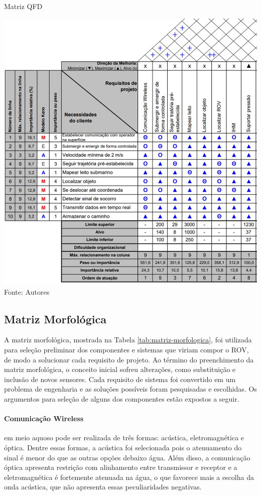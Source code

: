 \begin{table}[h!]
	\centering
	\caption{Matriz QFD}
	\label{tab:qfd-brov-recorte}
	\includegraphics[width=1\linewidth]{images/QFD-BROV.png}\\
	\footnotesize Fonte: Autores
\end{table}

\subsection{Matriz Morfológica}
\label{subsec:matriz-morfologica}

A matriz morfológica, mostrada na Tabela \ref{tab:matriz-morfologica}, foi utilizada para seleção preliminar dos componentes e sistemas que viriam compor o ROV, de modo a solucionar cada requisito de projeto. Ao término do preenchimento da matriz morfológica, o conceito inicial sofreu alterações, como substituição e inclusão de novos sensores. Cada requisito de sistema foi convertido em um problema de engenharia e as soluções possíveis foram pesquisadas e escolhidas. Os argumentos para seleção de alguns dos componentes estão expostos a seguir.

\paragraph{Comunicação Wireless} em meio aquoso pode ser realizada de três formas: acústica, eletromagnética e óptica. Dentre essas formas, a acústica foi selecionada pois o atenuamento do sinal é menor do que as outras opções debaixo água. Além disso, a comunicação óptica apresenta restrição com alinhamento entre transmissor e receptor e a eletromagnética é fortemente atenuada na água, o que favorece mais a escolha da onda acústica, que não apresenta essas peculiaridades negativas.

